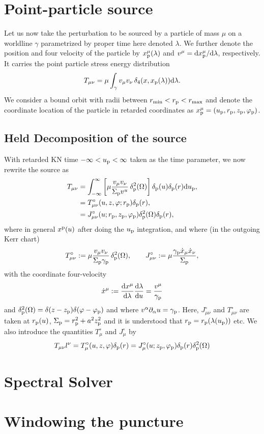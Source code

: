 \documentclass[preprint,aps,nofootinbib,a4paper,superscriptaddress,longbibliography,amsfonts, amssymb,amsmath,titlepage]{revtex4-1}
\numberwithin{equation}{section} %
\newcommand{\Held}[1]{{#1}^{\circ}}
\def\pd{\partial}
\def\dd{{\rm d}}
\def\pd{\partial}
\def\beq{\begin{equation}}
\def\eeq{\end{equation}}
\def\beq{\begin{equation}}
\def\eeq{\end{equation}}
\def\mn{\ensuremath{{\mu\nu}}}
\def\vphi{\ensuremath{{\varphi}}}
\def\p{{\rm p}}
\def\rp{r_{\p}}
\def\zp{z_\p}
\begin{document}
\section{Point-particle source}\label{subsec:source}
Let us now take the perturbation to be sourced by a particle of mass $\mu$ on a worldline $\gamma$ parametrized  by proper time here denoted $\lambda$. We further denote the position and four velocity of the particle by $x_\p^{\mu}(\lambda)$ and 
$v^\mu=\dd x_\p^\mu/\dd \lambda$, respectively.
It carries the point particle stress energy distribution
\beq\label{eq:stress pp}
T_{\mu\nu}=\mu\int_\gamma v_\mu v_\nu \,\delta_4(x,x_\p(\lambda)) \dd \lambda.
\eeq
We consider a bound orbit with radii between $r_{\rm min} < r_\p  < r_{\rm max} $ and denote the coordinate location of the particle in  retarded coordinates as $x^\mu_\p = (u_\p, r_\p,z_\p, \varphi_\p)$.  

\subsection{Held Decomposition of the source}

With retarded KN time $-\infty < u_\p < \infty$ taken as the time parameter, we now rewrite the source as
\begin{align}\label{eq:stress pp Held}
T_{\mn} &=\int_{-\infty}^\infty \left[ \mu\frac{ v_\mu v_\nu}{\Sigma_\p v^u}  \, \delta^{2}_{\p}(\Omega)  \right] \delta_\p(u) \delta_\p(r)  \dd u_\p , \\
&= \Held T_{\mu\nu}(u,z,\varphi;\rp)\delta_\p(r), \\
&=  \Held J_{\mu\nu}(u;r_\p,z_\p,\varphi_\p)\delta_\p^2(\Omega)\delta_\p(r),
\end{align}
where in general $x^\p(u)$ after doing the $u_\p$ integration, and 
where (in the outgoing Kerr chart)
\begin{equation}\label{eq:J}
T^{\circ}_{\mn}  :=
\mu\frac{ v_\mu v_\nu}{\Sigma_\p \gamma_\p}  \, \delta^{2}_{\p}(\Omega), %
\qquad \Held J_{\mu\nu} := \mu\frac{\gamma_\p \dot x_\mu \dot x_\nu}{\Sigma_\p },
\end{equation} 
with the coordinate four-velocity
\begin{equation}
    \dot x^\mu := \frac{\dd x^\mu}{\dd\lambda}\frac{\dd\lambda}{\dd u} = \frac{v^\mu}{\gamma_\p}
\end{equation}
and
$\delta^{2}_{\p}(\Omega)=\delta(z-\zp)\delta(\varphi-\varphi_{\p})$ and where 
$ v^\alpha \pd_\alpha u = \gamma_\p $. Here, $J_{\mu\nu}^\circ$ and $\Held T_{\mu \nu}$ are taken at $\rp(u)$, $\Sigma_\p = r_\p^2+a^2z_\p^2$ and it is understood that $r_\p =r_\p(\lambda(u_\p))$ etc.
We also introduce the quantities $T_\mu^\circ$ and $\Held J_\mu$ by
\begin{align}\label{eq:Tcirc hat}
T_{\mu \nu}l^{\nu} = T^{\circ}_\mu (u,z,\varphi)\delta_{\p}(r) = \Held J_\mu(u;z_\p,\varphi_\p)   \delta_{\p}(r) \delta_\p^2(\Omega)
\end{align}

\section{Spectral Solver}

\section{Windowing the puncture}
\end{document}
